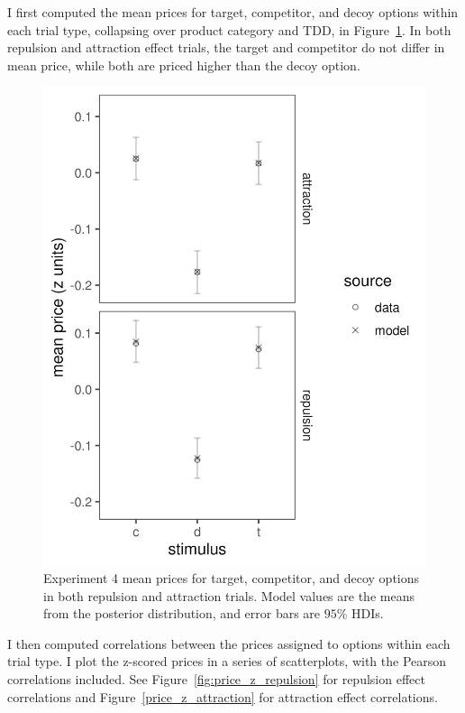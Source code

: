 I first computed the mean prices for target, competitor, and decoy options within each trial type, collapsing over product category and TDD, in Figure~\ref{fig:price_mu_model_data}. In both repulsion and attraction effect trials, the target and competitor do not differ in mean price, while both are priced higher than the decoy option.

\begin{figure}
    \includegraphics{figures/pricing_mu_model_data.jpeg}
    \caption{Experiment 4 mean prices for target, competitor, and decoy options in both repulsion and attraction trials. Model values are the means from the posterior distribution, and error bars are $95\%$ HDIs.}
    \label{fig:price_mu_model_data}
\end{figure}

I then computed correlations between the prices assigned to options within each trial type. I plot the z-scored prices in a series of scatterplots, with the Pearson correlations included. See Figure~\ref{fig:price_z_repulsion} for repulsion effect correlations and Figure~\ref{price_z_attraction} for attraction effect correlations. 

